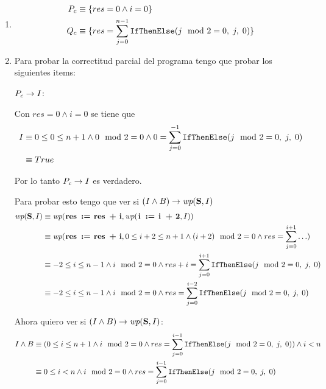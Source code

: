 \begin{enumerate}[label=\alph*)]
    \item \begin{align*}
              P_c & \equiv \{res = 0 \land i = 0\}                            \\
              Q_c & \equiv \{res = \sum_{j=0}^{n-1} \text{\normalfont\ttfamily IfThenElse}(j \mod 2 = 0,\;j,\;0)\}
          \end{align*}

    \item Para probar la correctitud parcial del programa tengo que probar los siguientes items:

          $P_c \rightarrow I$:

          Con $res = 0 \land i = 0$ se tiene que
          \begin{align*}
              I & \equiv 0 \leq 0 \leq n + 1 \land 0 \mod 2 = 0 \land 0 = \sum_{j=0}^{-1}\text{\normalfont\ttfamily IfThenElse}(j \mod 2 = 0,\;j,\;0) \\
                & \equiv True
          \end{align*}

          Por lo tanto $P_c \rightarrow I$ es verdadero.
          \bigskip


          Para probar esto tengo que ver si $(I \land B) \Then \wp{S}{I}$
          \begin{align*}
              \wp{S}{I} & \equiv \wp{res := res + i}{\wp{i := i + 2}{I}}                                                                 \\
                        & \equiv \wp{res := res + i}{0 \leq i + 2 \leq n + 1 \land (i+2) \mod 2 = 0 \land res = \sum_{j=0}^{i+1} \ldots} \\
                        & \equiv -2 \leq i \leq n - 1 \land i \mod 2 = 0 \land res + i = \sum_{j=0}^{i+1} \If{j \mod 2 = 0}{j}{0}        \\
                        & \equiv -2 \leq i \leq n - 1 \land i \mod 2 = 0 \land res = \sum_{j=0}^{i-2} \If{j \mod 2 = 0}{j}{0}
          \end{align*}

          Ahora quiero ver si $(I \land B) \Then \wp{S}{I}$:
          \begin{align*}
              I \land B & \equiv (0 \leq i \leq n + 1 \land i \mod 2 = 0 \land res = \sum_{j=0}^{i-1} \text{\normalfont\ttfamily IfThenElse}(j \mod 2 = 0,\;j,\;0)) \land i < n \\
                        & \equiv 0 \leq i < n \land i \mod 2 = 0 \land res = \sum_{j=0}^{i-1} \text{\normalfont\ttfamily IfThenElse}(j \mod 2 = 0,\;j,\;0)
          \end{align*}


\end{enumerate}
